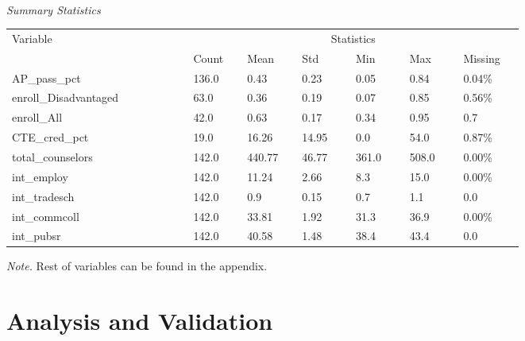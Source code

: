 \documentclass[10pt]{beamer}
\begin{document}
\begin{frame}
    \begin{threeparttable}
        \caption{\\\textit{Summary Statistics}}
        \begin{tabular}{ p{0.27\linewidth} p{0.08\linewidth} p{0.08\linewidth} p{0.08\linewidth} p{0.08\linewidth} p{0.08\linewidth} p{0.08\linewidth}}
            \toprule
            Variable & \multicolumn{6}{c}{Statistics} \\
            \cmidrule(r){2-7}
            &    Count   &   Mean & Std & Min & Max & Missing  \\ 
            \midrule
            AP\_pass\_pct &  136.0  &  0.43 & 0.23 & 0.05 & 0.84 & 0.04\%  \\ 
            enroll\_Disadvantaged &  63.0  &  0.36 & 0.19 & 0.07 & 0.85 & 0.56\%   \\
            enroll\_All &  42.0  &  0.63 & 0.17 & 0.34 & 0.95 & 0.7  \\
            CTE\_cred\_pct &  19.0  &  16.26 & 14.95 & 0.0 & 54.0 & 0.87\%  \\ 
            total\_counselors &  142.0  &  440.77 & 46.77 & 361.0 & 508.0 & 0.00\% \\
            int\_employ &  142.0  &  11.24 & 2.66 & 8.3 & 15.0 & 0.00\%  \\
            int\_tradesch &  142.0  &  0.9 & 0.15 & 0.7 & 1.1 & 0.0  \\ 
            int\_commcoll &  142.0  &  33.81 & 1.92 & 31.3 & 36.9 & 0.00\% \\
            int\_pubsr &  142.0  &  40.58 & 1.48 & 38.4 & 43.4 & 0.0  \\
            \midrule
        \end{tabular}
        \small \emph{Note.} Rest of variables can be found in the appendix.
        \end{threeparttable}
\end{frame}

\section{Analysis and Validation}
\end{document}

